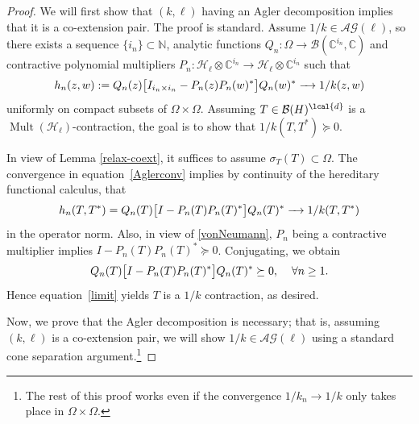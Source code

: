 \documentclass[a4paper,reqno,index]{amsart}
\numberwithin{equation}{section}
\newcommand{\CC}{\mathbb{C}}
\newcommand{\Mult}{\operatorname{Mult}}
\newcommand{\cH}{\mathcal{H}}
\newcommand{\specT}{\sigma_T}  %
\theoremstyle{definition}
\begin{document}
\begin{proof}   We will first show that $(k, \ell)$ having an Agler decomposition implies that it is a co-extension pair. The proof is standard. Assume $1/k\in \mathcal{AG}(\ell)$, so there exists a sequence $\{i_n\}\subset\mathbb{N}$, analytic functions $Q_n:\Omega\to \mathcal{B}(\mathbb{C}^{i_n}, \CC)$ and contractive polynomial multipliers $P_n:\mathcal{H}_{\ell}\otimes\mathbb{C}^{i_n}\to\mathcal{H}_{\ell}\otimes\mathbb{C}^{i_n}$ such that
\begin{equation}  \label{Aglerconv}
    h_n(z, w):=Q_n(z)\big[I_{i_n\times i_n}-P_n(z)P_n(w)^* \big]Q_n(w)^*\xrightarrow{\text{\hspace{0.1 cm} \hspace{0.1 cm}}}  1/k(z, w) 
\end{equation}
 uniformly on compact subsets of $\Omega\times\Omega.$
Assuming $T\in\mathcal{B}(H)^{\lcal{d}}$ is a $\Mult(\cH_\ell)$-contraction,
 the goal is to show that $1/k(T, T^*)\succeq 0.$ 
\par

In view of Lemma \ref{relax-coext}, it suffices to assume $\specT(T)\subset\Omega$. The convergence in equation~\eqref{Aglerconv} implies by continuity of the hereditary functional calculus, that
\begin{equation}\label{limit}
    h_n(T, T^*)=Q_n(T)\big[I-P_n(T)P_n(T)^*\big]Q_n(T)^*\xrightarrow{\text{\hspace{0.1 cm} \hspace{0.1 cm}}}1/k(T, T^*)
\end{equation}
in the operator norm. Also, in view of \eqref{vonNeumann}, $P_n$ being a contractive multiplier implies $I-P_n(T)P_n(T)^*\succeq 0$. Conjugating, we obtain
\begin{equation*} 
Q_n(T)\big[I-P_n(T)P_n(T)^*\big]Q_n(T)^*\succeq 0, \hspace{0.4 cm} \forall n\ge 1.
\end{equation*}
Hence equation~\eqref{limit} yields $T$ is a $1/k$ contraction, as desired.  \par 

Now, we prove that the Agler decomposition is necessary; that is, assuming $(k,\ell)$ is a co-extension pair,
we will show $1/k\in \mathcal{AG}(\ell)$ using a standard cone separation argument.\footnote{The rest of this proof works even if the convergence $1/k_n\to 1/k$ only takes place in $\Omega\times\Omega$.}
 

\end{proof}
\end{document}
